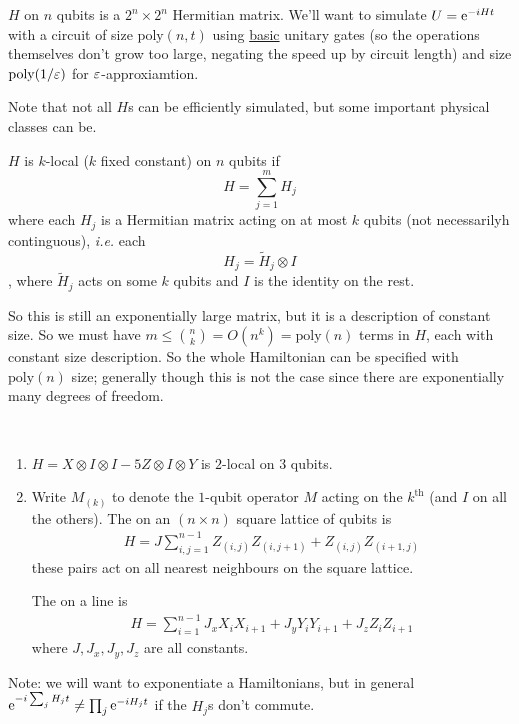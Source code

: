 \documentclass[]{article}
\newcommand{\poly}{\textrm{poly}}
\begin{document}
$H$ on $n$ qubits is a $2^n\times 2^n$ Hermitian matrix. We'll want to simulate $U = \mathrm{e}^{-iHt}$ with a circuit of size $\poly(n,t)$ using \underline{basic} unitary gates (so the operations themselves don't grow too large, negating the speed up by circuit length) and size $\poly(1/\eps)$ for $\varepsilon$-approxiamtion.

Note that not all $H$s can be efficiently simulated, but some important physical classes can be.

\begin{defin*}[$k$-local]
	$H$ is $k$-local ($k$ fixed constant) on $n$ qubits if $$H = \sum_{j=1}^{m} H_j$$ where each $H_j$ is a Hermitian matrix acting on at most $k$ qubits (not necessarilyh continguous), \textit{i.e.} each $$H_j = \tilde{H}_j \otimes I$$, where $\tilde{H}_j$ acts on some $k$ qubits and $I$ is the identity on the rest.
\end{defin*}

So this is still an exponentially large matrix, but it is a description of constant size. So we must have $m\le \binom{n}{k} = O(n^k) = \poly(n)$ terms in $H$, each with constant size description. So the whole Hamiltonian can be specified with $\poly(n)$ size; generally though this is not the case since there are exponentially many degrees of freedom.

\begin{remark*}[Examples]\ 
	\begin{enumerate}[label=\arabic*)]
		\item $H = X\otimes I\otimes I - 5Z\otimes I\otimes Y$ is $2$-local on $3$ qubits.
		\item Write $M_{(k)}$ to denote the $1$-qubit operator $M$ acting on the $k^{\textrm{th}}$ (and $I$ on all the others). The  on an $(n\times n)$ square lattice of qubits is
		\begin{align*}
			H = J\sum_{i,j=1}^{n-1}Z_{(i,j)}Z_{(i,j+1)} + Z_{(i,j)}Z_{(i+1,j)}
		\end{align*}
		these pairs act on all nearest neighbours on the square lattice.

		The  on a line is
		\begin{align*}
			H = \sum_{i=1}^{n-1}J_xX_iX_{i+1} + J_yY_iY_{i+1}+J_zZ_iZ_{i+1}
		\end{align*}
		where $J,J_x,J_y,J_z$ are all constants.
	\end{enumerate}
\end{remark*}

Note: we will want to exponentiate a Hamiltonians, but in general $\mathrm{e}^{-i\sum_j H_jt}\ne \prod_j \mathrm{e}^{-iH_jt}$ if the $H_j$s don't commute.
\end{document}
